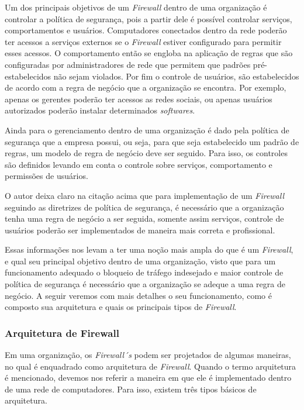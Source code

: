 Um dos principais objetivos de um \textit{Firewall} dentro de uma organização é controlar a política de segurança, pois a partir dele é possível controlar serviços, comportamentos e usuários. Computadores conectados dentro da rede poderão ter acessos a serviços externos se o \textit{Firewall} estiver configurado para permitir esses acessos. O comportamento então se engloba na aplicação de regras que são configuradas por administradores de rede que permitem que padrões pré-estabelecidos não sejam violados. Por fim o controle de usuários, são estabelecidos de acordo com a regra de negócio que a organização se encontra. Por exemplo, apenas os gerentes poderão ter acessos as redes sociais, ou apenas usuários autorizados poderão instalar determinados \textit{softwares}.

Ainda para  o gerenciamento dentro de uma organização é dado pela política de segurança que a empresa possui, ou seja, para que seja estabelecido um padrão de regras, um modelo de regra de negócio deve ser seguido. Para isso, os controles são definidos levando em conta o controle sobre serviços, comportamento e permissões de usuários. 

O autor deixa claro na citação acima que para implementação de um \textit{Firewall} seguindo as diretrizes de política de segurança, é necessário que a organização tenha uma regra de negócio a ser seguida, somente assim serviços, controle de usuários poderão ser implementados de maneira mais correta e profissional.

Essas informações nos levam a ter uma noção mais ampla do que é um \textit{Firewall}, e qual seu principal objetivo dentro de uma organização, visto que para um funcionamento adequado o bloqueio de tráfego indesejado e maior controle de política de segurança é necessário que a organização se adeque a uma regra de negócio. A seguir veremos com mais detalhes o seu funcionamento, como é composto sua arquitetura e quais os principais tipos de \textit{Firewall}.

\subsubsection{Arquitetura de Firewall}
Em uma organização, os \textit{Firewall´s} podem ser projetados de algumas maneiras, no qual é enquadrado como arquitetura de \textit{Firewall}. Quando o termo arquitetura é mencionado, devemos nos referir a maneira em que ele é implementado dentro de uma rede de computadores. Para isso, existem três tipos básicos de arquitetura.

